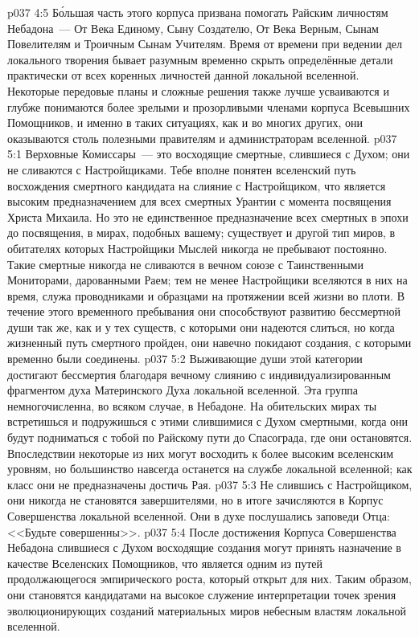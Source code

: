 \vs p037 4:5 Б\'ольшая часть этого корпуса призвана помогать Райским личностям Небадона~--- От Века Единому, Сыну Создателю, От Века Верным, Сынам Повелителям и Троичным Сынам Учителям. Время от времени при ведении дел локального творения бывает разумным временно скрыть определённые детали практически от всех коренных личностей данной локальной вселенной. Некоторые передовые планы и сложные решения также лучше усваиваются и глубже понимаются более зрелыми и прозорливыми членами корпуса Всевышних Помощников, и именно в таких ситуациях, как и во многих других, они оказываются столь полезными правителям и администраторам вселенной.
\vs p037 5:1 Верховные Комиссары~--- это восходящие смертные, слившиеся с Духом; они не сливаются с Настройщиками. Тебе вполне понятен вселенский путь восхождения смертного кандидата на слияние с Настройщиком, что является высоким предназначением для всех смертных Урантии с момента посвящения Христа Михаила. Но это не единственное предназначение всех смертных в эпохи до посвящения, в мирах, подобных вашему; существует и другой тип миров, в обитателях которых Настройщики Мыслей никогда не пребывают постоянно. Такие смертные никогда не сливаются в вечном союзе с Таинственными Мониторами, дарованными Раем; тем не менее Настройщики вселяются в них на время, служа проводниками и образцами на протяжении всей жизни во плоти. В течение этого временного пребывания они способствуют развитию бессмертной души так же, как и у тех существ, с которыми они надеются слиться, но когда жизненный путь смертного пройден, они навечно покидают создания, с которыми временно были соединены.
\vs p037 5:2 Выживающие души этой категории достигают бессмертия благодаря вечному слиянию с индивидуализированным фрагментом духа Материнского Духа локальной вселенной. Эта группа немногочисленна, во всяком случае, в Небадоне. На обительских мирах ты встретишься и подружишься с этими слившимися с Духом смертными, когда они будут подниматься с тобой по Райскому пути до Спасограда, где они остановятся. Впоследствии некоторые из них могут восходить к более высоким вселенским уровням, но большинство навсегда останется на службе локальной вселенной; как класс они не предназначены достичь Рая.
\vs p037 5:3 Не слившись с Настройщиком, они никогда не становятся завершителями, но в итоге зачисляются в Корпус Совершенства локальной вселенной. Они в духе послушались заповеди Отца: <<Будьте совершенны>>.
\vs p037 5:4 \pc После достижения Корпуса Совершенства Небадона слившиеся с Духом восходящие создания могут принять назначение в качестве Вселенских Помощников, что является одним из путей продолжающегося эмпирического роста, который открыт для них. Таким образом, они становятся кандидатами на высокое служение интерпретации точек зрения эволюционирующих созданий материальных миров небесным властям локальной вселенной.
